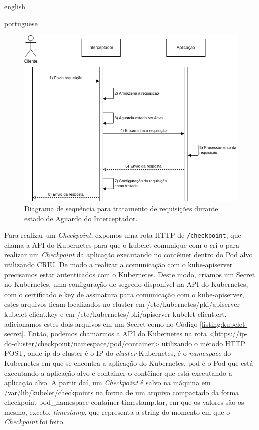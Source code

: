 \begin{otherlanguage*}{english}
\begin{otherlanguage*}{portuguese}
\begin{figure}[h]
\centering
\includegraphics[scale=0.64]{images/wait-state.png}
\caption{Diagrama de sequência para tratamento de requisições durante estado de Aguardo do Interceptador.}
\label{fig:diagram-wait-state-interceptor}
\end{figure}

Para realizar um \textit{Checkpoint}, expomos uma rota HTTP de \texttt{/checkpoint}, que
chama a API do Kubernetes para que o kubelet comunique com o cri-o para realizar um 
\textit{Checkpoint} da aplicação executando no contêiner dentro do Pod alvo utilizando
CRIU. De modo a realizar a comunicação com o kube-apiserver precisamos estar autenticados
com o Kubernetes. Deste modo, criamos um Secret no Kubernetes, uma configuração de segredo
disponível na API do Kubernetes, com o certificado e key de assinatura para comunicação
com o kube-apiserver, estes arquivos ficam localizados no cluster em
/etc/kubernetes/pki/apiserver-kubelet-client.key e em
/etc/kubernetes/pki/apiserver-kubelet-client.crt, adicionamos estes dois arquivos em um
Secret como no Código \ref{listing:kubelet-secret}. Então, podemos chamarmos a API
do Kubernetes na rota <https://ip-do-cluster/checkpoint/namespace/pod/container>
utilizando o método HTTP POST, onde ip-do-cluster é o IP do \textit{cluster} Kubernetes,
é o \textit{namespace} do Kubernetes em que se encontra a aplicação do Kubernetes, pod é
o Pod que está executando a aplicação alvo e container o contêiner que está executando a
aplicação alvo. A partir daí, um \textit{Checkpoint} é salvo na máquina em
/var/lib/kubelet/checkpoints na forma de um arquivo compactado da forma
checkpoint-pod\_namespace-container-timestamp.tar, em que os valores são os mesmo,
exceto, \textit{timestamp}, que representa a string do momento em que o \textit{Checkpoint}
foi feito.


\end{otherlanguage*}
\end{otherlanguage*}
